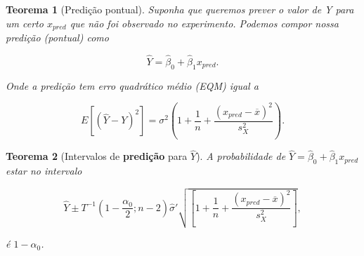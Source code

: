 \documentclass{article}
\newtheorem{theorem}{Teorema}
\begin{document}
\begin{theorem}[Predição pontual]
Suponha que queremos prever o valor de Y para um certo $x_{pred}$ que não foi observado no experimento. Podemos compor nossa predição (pontual) como

\begin{equation}
    \hat{Y} = \hat{\beta}_0 + \hat{\beta}_1 x_{pred}.
\end{equation}

Onde a predição tem erro quadrático médio (EQM) igual a

$$E \left [ (\hat{Y} - Y)^2 \right ] = \sigma^2 \left ( 1 + \frac{1}{n} + \frac{(x_{pred} - \overline{x})^2}{s_X^2} \right ).$$
\end{theorem}

\begin{theorem}[Intervalos de \textbf{predição} para $\hat{Y}$]
A probabilidade de $\hat{Y} = \hat{\beta}_0 + \hat{\beta}_1 x_{pred}$ estar no intervalo

$$\hat{Y} \pm T^{-1} (1 - \frac{\alpha_0}{2}; n - 2) \hat{\sigma}' \sqrt{\left [ 1 + \frac{1}{n} + \frac{(x_{pred} - \overline{x})^2}{s_X^2} \right ]},$$

é $1 - \alpha_0$.
\end{theorem}
\end{document}

